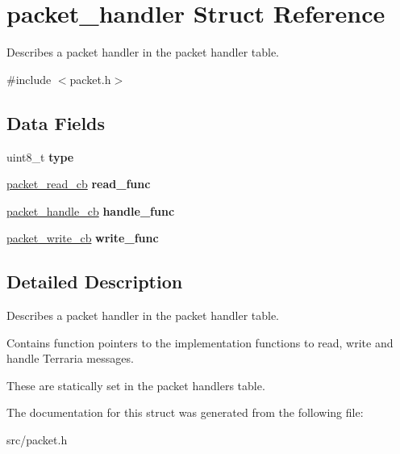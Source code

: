 \hypertarget{structpacket__handler}{}\section{packet\+\_\+handler Struct Reference}
\label{structpacket__handler}


Describes a packet handler in the packet handler table.  




{\ttfamily \#include $<$packet.\+h$>$}

\subsection*{Data Fields}
\begin{DoxyCompactItemize}
\item 
\hypertarget{group__packet_gacda150a3844cee9928fc89d9c1e0204e}{}uint8\+\_\+t {\bfseries type}\label{group__packet_gacda150a3844cee9928fc89d9c1e0204e}

\item 
\hypertarget{group__packet_ga043987d5914119b6cb9fd322cad1731c}{}\hyperlink{group__packet_ga60dc8d100ec60f5abb142f1f2253e6b2}{packet\+\_\+read\+\_\+cb} {\bfseries read\+\_\+func}\label{group__packet_ga043987d5914119b6cb9fd322cad1731c}

\item 
\hypertarget{group__packet_ga83b542606e8c009aa6da139d5a89ed58}{}\hyperlink{group__packet_ga9d343d646c5c1e052d61561702a4bf3e}{packet\+\_\+handle\+\_\+cb} {\bfseries handle\+\_\+func}\label{group__packet_ga83b542606e8c009aa6da139d5a89ed58}

\item 
\hypertarget{group__packet_ga54b6b0734e245ed023ef11387ec04c66}{}\hyperlink{group__packet_ga10aa1174318b280e6772d66ef7ff010e}{packet\+\_\+write\+\_\+cb} {\bfseries write\+\_\+func}\label{group__packet_ga54b6b0734e245ed023ef11387ec04c66}

\end{DoxyCompactItemize}


\subsection{Detailed Description}
Describes a packet handler in the packet handler table. 

Contains function pointers to the implementation functions to read, write and handle Terraria messages.

These are statically set in the packet handlers table. 

The documentation for this struct was generated from the following file\+:\begin{DoxyCompactItemize}
\item 
src/packet.\+h\end{DoxyCompactItemize}
